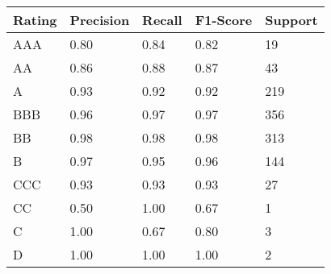 \begin{tabular}{lllll}
\toprule
Rating & Precision & Recall & F1-Score & Support \\
\midrule
AAA & 0.80 & 0.84 & 0.82 & 19 \\
AA & 0.86 & 0.88 & 0.87 & 43 \\
A & 0.93 & 0.92 & 0.92 & 219 \\
BBB & 0.96 & 0.97 & 0.97 & 356 \\
BB & 0.98 & 0.98 & 0.98 & 313 \\
B & 0.97 & 0.95 & 0.96 & 144 \\
CCC & 0.93 & 0.93 & 0.93 & 27 \\
CC & 0.50 & 1.00 & 0.67 & 1 \\
C & 1.00 & 0.67 & 0.80 & 3 \\
D & 1.00 & 1.00 & 1.00 & 2 \\
\bottomrule
\end{tabular}
